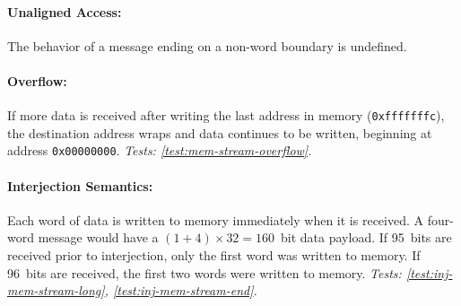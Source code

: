 \paragraph{Unaligned Access:} The behavior of a message ending on a
non-word boundary is undefined.

\paragraph{Overflow:} If more data is received after writing the last
address in memory ({\tt 0xfffffffc}), the destination address wraps and data
continues to be written, beginning at address {\tt 0x00000000}.
{\em Tests: \ref{test:mem-stream-overflow}.}

\paragraph{Interjection Semantics:} Each word of data is written to memory
immediately when it is received. A four-word message would have a
$(1+4)\times32=160$~bit data payload. If 95~bits are received prior to
interjection, only the first word was written to memory. If 96~bits are
received, the first two words were written to memory.
{\em Tests: \ref{test:inj-mem-stream-long}, \ref{test:inj-mem-stream-end}.}

